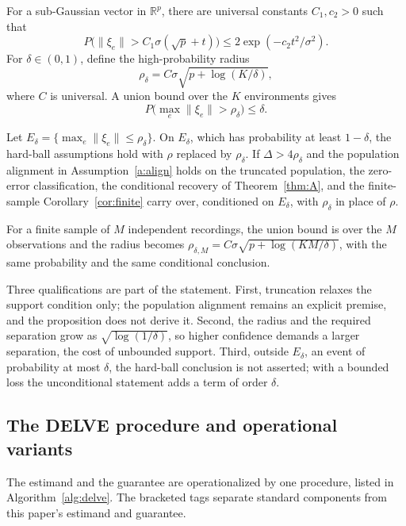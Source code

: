For a sub-Gaussian vector in \(\mathbb R^p\), there are universal
constants \(C_1,c_2>0\) such that
\[P\big(\|\xi_e\|>C_1\sigma(\sqrt p+t)\big)\le 2\exp(-c_2t^2/\sigma^2).\]
For \(\delta\in(0,1)\), define the high-probability radius
\[\rho_\delta=C\sigma\sqrt{p+\log(K/\delta)},\] where \(C\) is
universal. A union bound over the \(K\) environments gives
\[P\big(\max_e\|\xi_e\|>\rho_\delta\big)\le\delta.\]

\begin{proposition}\label{prop:trunc}
Let $E_\delta=\{\max_e\|\xi_e\|\le\rho_\delta\}$. On $E_\delta$, which has probability at least $1-\delta$, the hard-ball assumptions hold with $\rho$ replaced by $\rho_\delta$. If $\Delta>4\rho_\delta$ and the population alignment in Assumption~\ref{a:align} holds on the truncated population, the zero-error classification, the conditional recovery of Theorem~\ref{thm:A}, and the finite-sample Corollary~\ref{cor:finite} carry over, conditioned on $E_\delta$, with $\rho_\delta$ in place of $\rho$.
\end{proposition}

For a finite sample of \(M\) independent recordings, the union bound is
over the \(M\) observations and the radius becomes
\(\rho_{\delta,M}=C\sigma\sqrt{p+\log(KM/\delta)}\), with the same
probability and the same conditional conclusion.

Three qualifications are part of the statement. First, truncation
relaxes the support condition only; the population alignment remains an
explicit premise, and the proposition does not derive it. Second, the
radius and the required separation grow as \(\sqrt{\log(1/\delta)}\), so
higher confidence demands a larger separation, the cost of unbounded
support. Third, outside \(E_\delta\), an event of probability at most
\(\delta\), the hard-ball conclusion is not asserted; with a bounded
loss the unconditional statement adds a term of order \(\delta\).

\subsection{The DELVE procedure and operational
variants}\label{the-delve-procedure-and-operational-variants}

The estimand and the guarantee are operationalized by one procedure,
listed in Algorithm~\ref{alg:delve}. The bracketed tags
separate standard components from this paper's estimand and guarantee.

